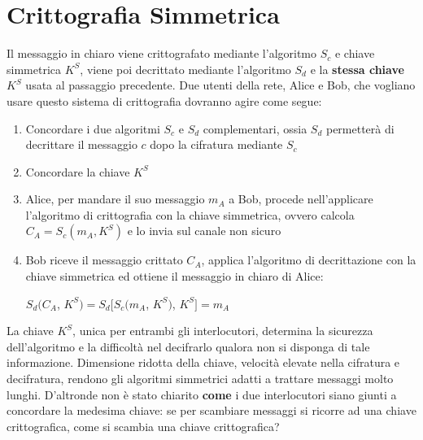 \documentclass[a4paper,12pt]{tesiinfo}
\begin{document}
\section{Crittografia Simmetrica}
Il messaggio in chiaro viene crittografato mediante l'algoritmo $S_c$ e chiave simmetrica $K^S$, viene poi decrittato mediante l'algoritmo $S_d$ e la \textbf{stessa chiave} $K^S$ usata al passaggio precedente. Due utenti della rete, Alice e Bob, che vogliano usare questo sistema di crittografia dovranno agire come segue: 
\begin{enumerate}
 \item Concordare i due algoritmi $S_c$ e $S_d$ complementari, ossia $S_d$ permetter\`a di decrittare il messaggio $c$ dopo la cifratura mediante $S_c$
 \item Concordare la chiave $K^S$
 \item Alice, per mandare il suo messaggio $m_A$ a Bob, procede nell'applicare l'algoritmo di crittografia con la chiave simmetrica, ovvero calcola $C_A = S_c(m_A, K^S)$ e lo invia sul canale non sicuro
 \item Bob riceve il messaggio crittato $C_A$, applica l'algoritmo di decrittazione con la chiave simmetrica ed ottiene il messaggio in chiaro di Alice: 
 \begin{center}
  $S_d(C_A$, $K^S) = S_d[S_c(m_A$, $K^S)$, $K^S] = m_A$
 \end{center}
\end{enumerate}
La chiave $K^S$, unica per entrambi gli interlocutori, determina la sicurezza dell'algoritmo e la difficolt\`a nel decifrarlo qualora non si disponga di tale informazione. Dimensione ridotta della chiave, velocit\`a elevate nella cifratura e decifratura, rendono gli algoritmi simmetrici adatti a trattare messaggi molto lunghi. D'altronde non \`e stato chiarito \textbf{come} i due interlocutori siano giunti a concordare la medesima chiave: se per scambiare messaggi si ricorre ad una chiave crittografica, come si scambia una chiave crittografica?
%
%
%
%
%
%
%
%
%
%
\end{document}
